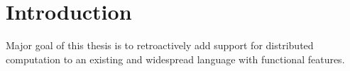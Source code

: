 \chapter*{Introduction}

Major goal of this thesis is to retroactively add support for distributed
computation to an existing and widespread language with functional features.

\lipsum[1]
